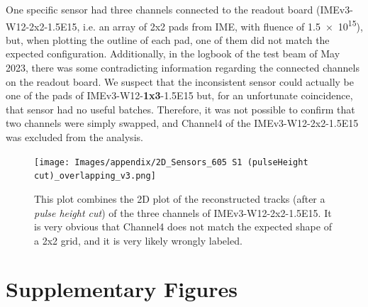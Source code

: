 One specific sensor had three channels connected to the readout board (IMEv3-W12-2x2-1.5E15, i.e. an array of 2x2 pads from IME, with fluence of \qty{1.5e15}{\neutroneq}), but, when plotting the outline of each pad, one of them did not match the expected configuration. Additionally, in the logbook of the test beam of May 2023, there was some contradicting information regarding the connected channels on the readout board. We suspect that the inconsistent sensor could actually be one of the pads of IMEv3-W12-\textbf{1x3}-1.5E15 but, for an unfortunate coincidence, that sensor had no useful batches. %
Therefore, it was not possible to confirm that two channels were simply swapped, and Channel4 of the IMEv3-W12-2x2-1.5E15 was excluded from the analysis.


\begin{figure}[h!tbp]
    \centering
    \texttt{[image: Images/appendix/2D\_Sensors\_605 S1 (pulseHeight cut)\_overlapping\_v3.png]}
    \caption{This plot combines the 2D plot of the reconstructed tracks (after a \textit{pulse height cut}) of the three channels of IMEv3-W12-2x2-1.5E15. It is very obvious that Channel4 does not match the expected shape of a 2x2 grid, and it is very likely wrongly labeled.}
    \label{fig:mislabeled_sensor}
\end{figure}

\section{Supplementary Figures}\label{sec:additional_plots}


